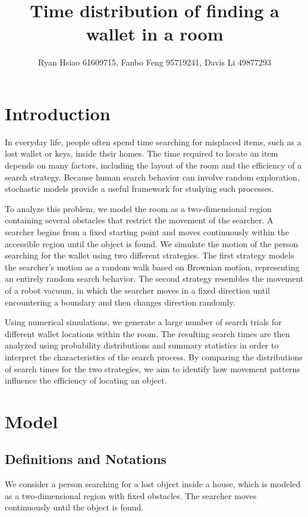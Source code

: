 \documentclass{article}
\title{Time distribution of finding a wallet in a room}
\author{Ryan Hsiao 61609715, Fanbo Feng 95719241, Davis Li 49877293}
\date{}  %
\begin{document}
\maketitle


\section{Introduction}
In everyday life, people often spend time searching for misplaced items, such as a lost wallet or keys, inside their homes. The time required to locate an item depends on many factors, including the layout of the room and the efficiency of a search strategy. Because human search behavior can involve random exploration, stochastic models provide a useful framework for studying such processes. 

\vspace{5mm}

\noindent To analyze this problem, we model the room as a two-dimensional region containing several obstacles that restrict the movement of the searcher. A searcher begins from a fixed starting point and moves continuously within the accessible region until the object is found. We simulate the motion of the person searching for the wallet using two different strategies. The first strategy models the searcher’s motion as a random walk based on Brownian motion, representing an entirely random search behavior. The second strategy resembles the movement of a robot vacuum, in which the searcher moves in a fixed direction until encountering a boundary and then changes direction randomly.

\vspace{5mm}

\noindent Using numerical simulations, we generate a large number of search trials for different wallet locations within the room. The resulting search times are then analyzed using probability distributions and summary statistics in order to interpret the characteristics of the search process. By comparing the distributions of search times for the two strategies, we aim to identify how movement patterns influence the efficiency of locating an object.

\section{Model}\label{sec:model}
\subsection{Definitions and Notations}
\noindent We consider a person searching for a lost object inside a house, which is modeled as a two-dimensional region with fixed obstacles. The searcher moves continuously until the object is found.
\end{document}
